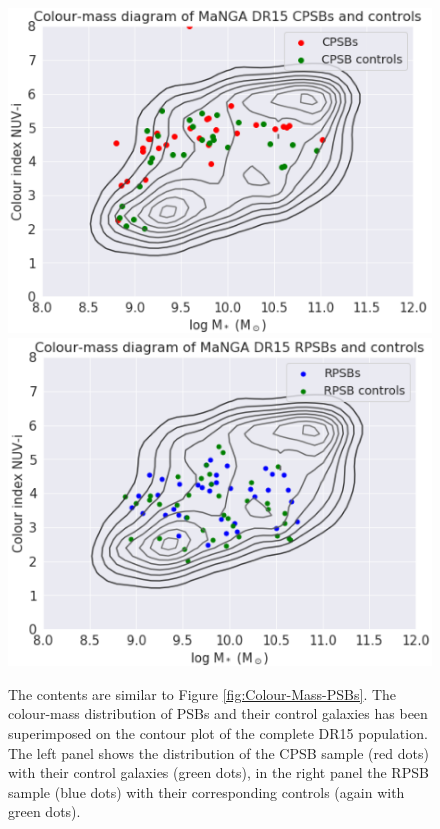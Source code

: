 \begin{figure}
    \centering
    \includegraphics[width=\columnwidth]{images/CMDs/CMD-CPSBs+Controls-15.png}
    \includegraphics[width=\columnwidth]{images/CMDs/CMD-RPSBs+Controls-15.png}
    \caption[Colour-mass distribution of PSBs and controls]{The contents are similar to Figure \ref{fig:Colour-Mass-PSBs}. The colour-mass distribution of PSBs and their control galaxies has been superimposed on the contour plot of the complete DR15 population. The left panel shows the distribution of the CPSB sample (red dots) with their control galaxies (green dots), in the right panel the RPSB sample (blue dots) with their corresponding controls (again with green dots).}
    \label{fig:Colour-Mass-PSBs-controls}
\end{figure}

